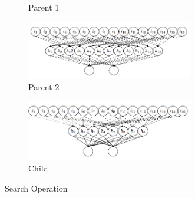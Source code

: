 \begin{figure}[h!]
	\centering
	\begin{subfigure}[b]{1.0\linewidth}
		\centering
    	
		\caption{Parent 1}
		\label{fig:p1}
	\end{subfigure}
	\newline
	\begin{subfigure}[b]{1.0\linewidth}
		\centering
		\includegraphics[width=0.8\textwidth]{./a0_figure_ann_for_clt_architecture_example2.png}
		\caption{Parent 2}
		\label{fig:p2}
	\end{subfigure}
	\newline
	\begin{subfigure}[b]{1.0\linewidth}
		\centering
		\includegraphics[width=0.8\textwidth]{./a0_figure_ann_for_clt_architecture_child.png}
		\caption{Child}
		\label{fig:child}
	\end{subfigure}
	\caption{Search Operation}
	\label{fig:search}
\end{figure}
